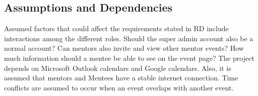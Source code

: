 \subsection{Assumptions and Dependencies}

Assumed factors that could affect the requirements stated in RD include
interactions among the different roles. Should the super admin account also be a
normal account? Can mentors also invite and view other mentor events? How much
information should a mentee be able to see on the event page? The project
depends on Microsoft Outlook calendars and Google calendars. Also, it is assumed
that mentors and Mentees have a stable internet connection. Time conflicts are
assumed to occur when an event overlaps with another event. 
